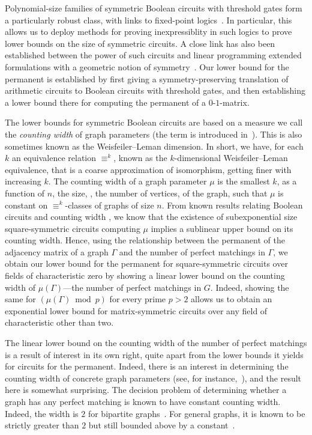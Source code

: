 \documentclass{toc}
\begin{document}
Polynomial-size families of symmetric Boolean circuits with threshold gates form
a particularly robust class, with links to fixed-point
logics~\cite{AndersonD17}. In particular, this allows us to deploy methods for
proving inexpressiblity in such logics to prove lower bounds on the size of
symmetric circuits. A close link has also been established between the power of
such circuits and linear programming extended formulations with a geometric
notion of symmetry~\cite{AtseriasDO19}. Our lower bound for the permanent is
established by first giving a symmetry-preserving translation of arithmetic
circuits to Boolean circuits with threshold gates, and then establishing a lower
bound there for computing the permanent of a $0$-$1$-matrix.

The lower bounds for symmetric Boolean circuits are based on a measure we call
the \emph{counting width} of graph parameters (the term is introduced
in~\cite{DawarW17}). This is also sometimes known as the Weisfeiler--Leman
dimension. In short, we have, for each $k$ an equivalence relation $\equiv^k$,
known as the $k$-dimensional Weisfeiler--Leman equivalence, that is a coarse
approximation of isomorphism, getting finer with increasing $k$. The counting
width of a graph parameter $\mu$ is the smallest $k$, as a function of
%
%
$n$, the size, \ie, the number of vertices, of the graph,  %
%
%
%
%
such that $\mu$ is constant on $\equiv^k$-classes of graphs of size
$n$. From known results relating Boolean circuits and counting
width \cite{AndersonD17,AtseriasDO19}, we know that the existence of
subexponential size square-symmetric circuits computing $\mu$ implies a sublinear upper
bound on its counting width.  Hence, using the relationship between the
permanent of the adjacency matrix of a graph $\Gamma$ and the number of
perfect matchings in $\Gamma$, we obtain our lower bound for the permanent
for square-symmetric circuits over fields of characteristic zero by showing a
linear lower bound on the counting width of $\mu(\Gamma)$---the number of perfect
matchings in $G$. Indeed, showing the same for $(\mu(\Gamma) \bmod p)$ for every
prime $p > 2$ allows us to obtain an exponential lower bound for
matrix-symmetric circuits over any field of characteristic other than two.

The linear lower bound on the counting width of the number of perfect matchings
is a result of interest in its own right, quite apart from the lower bounds it
yields for circuits for the permanent. Indeed, there is an interest in
determining the counting width of concrete graph parameters (see, for
instance,~\cite{ArvindFKV19}), and the result here is somewhat surprising. The
decision problem of determining whether a graph has any perfect matching is
known to have constant counting width. Indeed, the width is $2$ for bipartite
graphs~\cite{BlassGS02}. For general graphs, it is known to be strictly greater
than $2$ but still bounded above by a constant~\cite{AndersonDH15}.
\end{document}
